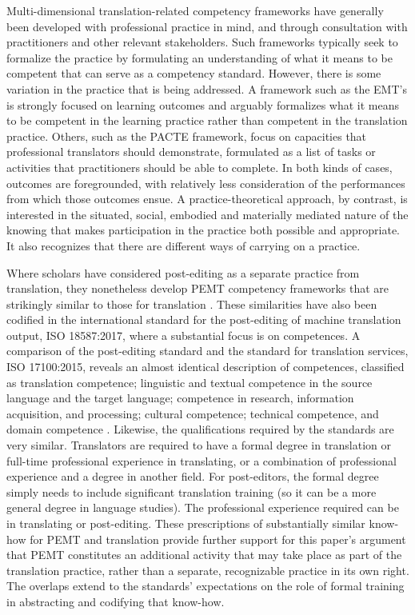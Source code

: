 \documentclass[output=paper,colorlinks,citecolor=brown]{langsci/langscibook}
\begin{document}
\hspace*{-1mm}Multi-dimensional translation-related competency frameworks have generally been developed with professional practice in mind, and through consultation with practitioners and other relevant stakeholders. Such frameworks typically seek to formalize the practice by formulating an understanding of what it means to be competent that can serve as a competency standard. However, there is some variation in the practice that is being addressed. A framework such as the EMT’s is strongly focused on learning outcomes and arguably formalizes what it means to be competent in the learning practice rather than competent in the translation practice. Others, such as the PACTE framework, focus on capacities that professional translators should demonstrate, formulated as a list of tasks or activities that practitioners should be able to complete. In both kinds of cases, outcomes are foregrounded, with relatively less consideration of the performances from which those outcomes ensue. A practice-theoretical approach, by contrast, is interested in the situated, social, embodied and materially mediated nature of the knowing that makes participation in the practice both possible and appropriate. It also recognizes that there are different ways of carrying on a practice.

Where scholars have considered post-editing as a separate practice from translation, they nonetheless develop PEMT competency frameworks that are strikingly similar to those for translation \citep[e.g.,][]{nitzke_risk_2019}. These similarities have also been codified in the international standard for the post-editing of machine translation output, ISO 18587:2017, where a substantial focus is on competences. A comparison of the post-editing standard and the standard for translation services, ISO 17100:2015, reveals an almost identical description of competences, classified as translation competence; linguistic and textual competence in the source language and the target language; competence in research, information acquisition, and processing; cultural competence; technical competence, and domain competence \citep{british_standards_institution_iso_2015,british_standards_institution_iso_2017}. Likewise, the qualifications required by the standards are very similar. Translators are required to have a formal degree in translation or full-time professional experience in translating, or a combination of professional experience and a degree in another field. For post-editors, the formal degree simply needs to include significant translation training (so it can be a more general degree in language studies). The professional experience required can be in translating or post-editing. These prescriptions of substantially similar know-how for PEMT and translation provide further support for this paper’s argument that PEMT constitutes an additional activity that may take place as part of the translation practice, rather than a separate, recognizable practice in its own right. The overlaps extend to the standards’ expectations on the role of formal training in abstracting and codifying that know-how. 
\end{document}
